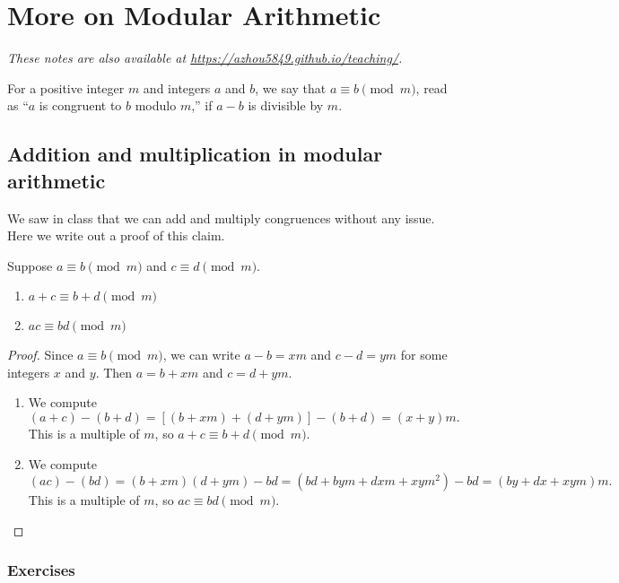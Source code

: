 \section{More on Modular Arithmetic}

\textit{These notes are also available at \url{https://azhou5849.github.io/teaching/}.}

For a positive integer $m$ and integers $a$ and $b$, we say that $a\equiv b\pmod{m}$, read as ``$a$ is congruent to $b$ modulo $m$,'' if $a - b$ is divisible by $m$.

\subsection{Addition and multiplication in modular arithmetic}

We saw in class that we can add and multiply congruences without any issue. Here we write out a proof of this claim.

\begin{proposition}
Suppose $a\equiv b\pmod{m}$ and $c\equiv d\pmod{m}$.
\begin{enumerate}
\item $a + c\equiv b + d\pmod{m}$
\item $ac\equiv bd\pmod{m}$
\end{enumerate}
\end{proposition}
\begin{proof}
Since $a\equiv b\pmod{m}$, we can write $a - b = xm$ and $c - d = ym$ for some integers $x$ and $y$. Then $a = b + xm$ and $c = d + ym$.
\begin{enumerate}
\item We compute
\begin{equation*}
(a + c) - (b + d) = [(b + xm) + (d + ym)] - (b + d) = (x + y)m.
\end{equation*}
This is a multiple of $m$, so $a + c\equiv b + d\pmod{m}$.
\item We compute 
\begin{equation*}
(ac) - (bd) = (b + xm)(d + ym) - bd = (bd + bym + dxm + xym^2) - bd = (by + dx + xym)m.
\end{equation*}
This is a multiple of $m$, so $ac\equiv bd\pmod{m}$.
\end{enumerate}
\end{proof}

\subsubsection*{Exercises}

